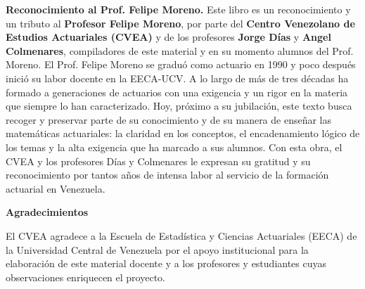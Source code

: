 \vspace{1em}
\textbf{Reconocimiento al Prof. Felipe Moreno.} Este libro es un reconocimiento y un tributo al \textbf{Profesor Felipe Moreno}, por parte del \textbf{Centro Venezolano de Estudios Actuariales (CVEA)} y de los profesores \textbf{Jorge Días} y \textbf{Angel Colmenares}, compiladores de este material y en su momento alumnos del Prof. Moreno. El Prof. Felipe Moreno se graduó como actuario en 1990 y poco después inició su labor docente en la EECA-UCV. A lo largo de más de tres décadas ha formado a generaciones de actuarios con una exigencia y un rigor en la materia que siempre lo han caracterizado. Hoy, próximo a su jubilación, este texto busca recoger y preservar parte de su conocimiento y de su manera de enseñar las matemáticas actuariales: la claridad en los conceptos, el encadenamiento lógico de los temas y la alta exigencia que ha marcado a sus alumnos. Con esta obra, el CVEA y los profesores Días y Colmenares le expresan su gratitud y su reconocimiento por tantos años de intensa labor al servicio de la formación actuarial en Venezuela.

\vfill
\newpage

\thispagestyle{empty}
\vspace*{1.5cm}
\begin{center}
{\large\bfseries Agradecimientos}
\end{center}
\vspace{1.5cm}

El CVEA agradece a la Escuela de Estadística y Ciencias Actuariales (EECA) de la Universidad Central de Venezuela por el apoyo institucional para la elaboración de este material docente y a los profesores y estudiantes cuyas observaciones enriquecen el proyecto.

\vfill
\newpage
\pagestyle{plain}
\let\cleardoublepage\savedcleardoublepage

